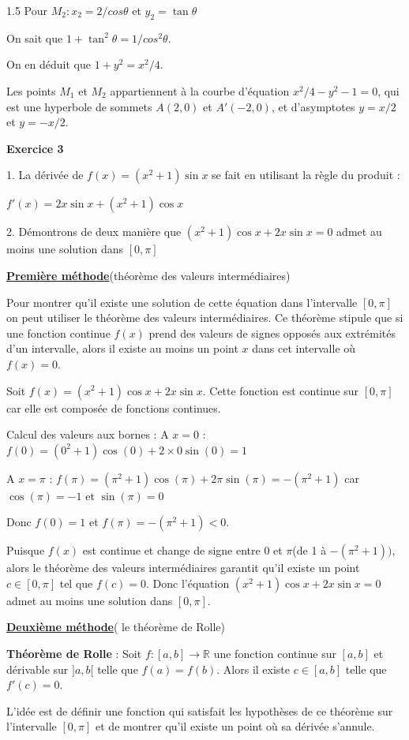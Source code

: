 \documentclass[12pt]{article}
\begin{document}
\begin{spacing}{1.5}
Pour $M_2 : x_2 = 2/cos\theta$ et $y_2 = \tan\theta$

On sait que $1 + \tan^2\theta = 1/cos^2\theta$. 

On en déduit que $1 + y^2= x^2/4$. 

Les points $M_1$ et $M_2$ appartiennent à la courbe d'équation $x^2/4-y^2-1 = 0$, qui est une 
hyperbole de sommets $A(2,0)$ et $A'(-2,0)$, et d'asymptotes $y = x/2$ et $y =-x/2$.

\medskip\textbf{Exercice 3}

1. La dérivée de $f(x)=(x^2+1)\sin x$ se fait en utilisant la règle du produit : 

$f'(x)=2x\sin x+(x^2+1)\cos x$

2. Démontrons de deux manière que $(x^2+1)\cos x+2x\sin x=0$ admet au moins une solution dans $[0,\pi]$

\underline{\textbf{Première méthode}}(théorème des valeurs intermédiaires)

Pour montrer qu'il existe une solution de cette équation dans l'intervalle $[0,\pi]$ on peut utiliser le théorème des valeurs intermédiaires. Ce théorème stipule que si une fonction continue $f(x)$ prend des valeurs de signes opposés aux extrémités d'un intervalle, alors il existe au moins un point $x$ dans cet intervalle où $f(x)=0$.

Soit $f(x)=(x^2+1)\cos x+2x\sin x$. Cette fonction est continue sur $[0,\pi]$ car elle est composée de fonctions continues.

Calcul des valeurs aux bornes :
A $x=0$ : $f(0)=(0^2+1)\cos(0)+2\times 0\sin(0)=1$

A $x=\pi$ : $f(\pi)=(\pi^2+1)\cos(\pi)+2\pi\sin(\pi)=-(\pi^2+1)$ car $\cos(\pi)=-1$ et $\sin(\pi)=0$

Donc $f(0)=1$ et $f(\pi)=-(\pi^2+1)<0.$

\medskip Puisque $f(x)$ est continue et change de signe entre 0 et $\pi$(de 1 à $-(\pi^2+1))$, alors  le théorème des valeurs intermédiaires garantit qu'il existe un point $c\in [0,\pi]$ tel que $f(c)=0$. Donc l'équation $(x^2+1)\cos x+2x\sin x=0$ admet au moins une solution dans $[0,\pi]$.

\medskip\underline{\textbf{Deuxième méthode}}( le théorème de Rolle)

\medskip \textbf{Théorème de Rolle} : Soit $f : [a,b]\rightarrow \mathbb{R}$ une fonction continue sur $[a,b]$ et dérivable sur $]a,b[$ telle que $f(a)=f(b)$. Alors il existe $c\in [a,b]$ telle que $f'(c)=0$.

L'idée est de définir une fonction qui satisfait les hypothèses de ce théorème sur l'intervalle $[0,\pi]$ et de montrer qu'il existe un point où sa dérivée s'annule.


\end{spacing}
\end{document}
